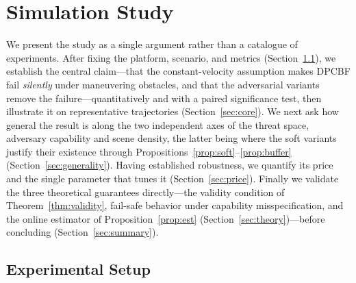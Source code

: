 \section{Simulation Study}
\label{sec:results}

We present the study as a single argument rather than a catalogue of
experiments. After fixing the platform, scenario, and metrics
(Section~\ref{sec:setup}), we establish the central claim---that the
constant-velocity assumption makes DPCBF fail \emph{silently} under
maneuvering obstacles, and that the adversarial variants remove the
failure---quantitatively and with a paired significance test, then
illustrate it on representative trajectories (Section~\ref{sec:core}). We
next ask how general the result is along the two independent axes of the
threat space, adversary capability and scene density, the latter being where
the soft variants justify their existence through
Propositions~\ref{prop:soft}--\ref{prop:buffer}
(Section~\ref{sec:generality}). Having established robustness, we quantify
its price and the single parameter that tunes it (Section~\ref{sec:price}).
Finally we validate the three theoretical guarantees directly---the validity
condition of Theorem~\ref{thm:validity}, fail-safe behavior under capability
misspecification, and the online estimator of Proposition~\ref{prop:est}
(Section~\ref{sec:theory})---before concluding (Section~\ref{sec:summary}).

\subsection{Experimental Setup}
\label{sec:setup}

